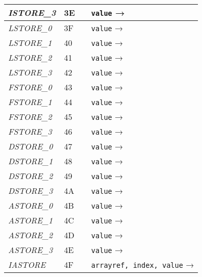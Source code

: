 \begin{center}
\begin{longtable}{ | p{} | p{} | p{} | p{} | }
        \emph{ISTORE\_3}
		& 3E & & \lstinline|value| →
		\\ \hline

        \emph{LSTORE\_0}
		& 3F & & \lstinline|value| →
		\\ \hline

        \emph{LSTORE\_1}
		& 40 & & \lstinline|value| →
		\\ \hline

        \emph{LSTORE\_2}
		& 41 & & \lstinline|value| →
		\\ \hline

        \emph{LSTORE\_3}
		& 42 & & \lstinline|value| →
		\\ \hline

        \emph{FSTORE\_0}
		& 43 & & \lstinline|value| →
		\\ \hline

        \emph{FSTORE\_1}
		& 44 & & \lstinline|value| →
		\\ \hline

        \emph{FSTORE\_2}
		& 45 & & \lstinline|value| →
		\\ \hline

        \emph{FSTORE\_3}
		& 46 & & \lstinline|value| →
		\\ \hline

        \emph{DSTORE\_0}
		& 47 & & \lstinline|value| →
		\\ \hline

        \emph{DSTORE\_1}
		& 48 & & \lstinline|value| →
		\\ \hline

        \emph{DSTORE\_2}
		& 49 & & \lstinline|value| →
		\\ \hline

        \emph{DSTORE\_3}
		& 4A & & \lstinline|value| →
		\\ \hline

        \emph{ASTORE\_0}
		& 4B & & \lstinline|value| →
		\\ \hline

        \emph{ASTORE\_1}
		& 4C & & \lstinline|value| →
		\\ \hline

        \emph{ASTORE\_2}
		& 4D & & \lstinline|value| →
		\\ \hline

        \emph{ASTORE\_3}
		& 4E & & \lstinline|value| →
		\\ \hline

        \emph{IASTORE}
		& 4F & & \lstinline|arrayref, index, value| →
		\\ \hline


\end{longtable}
\end{center}
